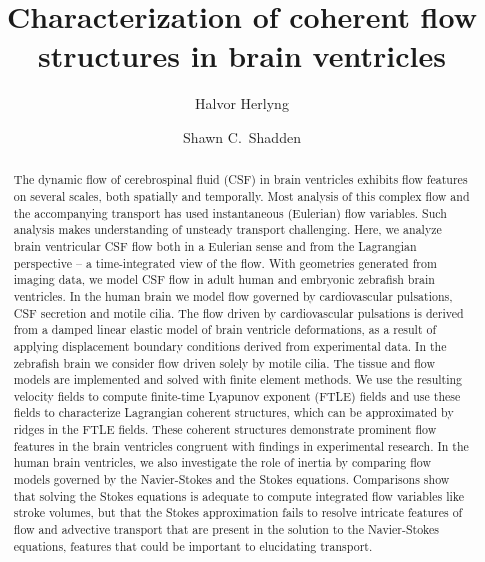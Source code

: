 \documentclass{template}
\title{\textbf{Characterization of coherent flow structures in brain ventricles}}
\author[1,2,*]{Halvor Herlyng}
\author[3]{Shawn C.~Shadden}
\affil[1]{Department of Numerical Analysis and Scientific Computing, Simula Research Laboratory, Oslo, Norway}
\affil[2]{Expert Analytics AS, Oslo, Norway}
\affil[3]{Department of Mechanical Engineering, University of California, Berkeley, USA}
\affil[*]{\href{mailto:halvor@xal.no}{halvor@xal.no}}
\date{\vspace{-2em}} %
\begin{document}
\maketitle

\begin{abstract}
    The dynamic flow of cerebrospinal fluid (CSF) in brain ventricles 
    exhibits flow features on several scales, both spatially and temporally.
    Most analysis of this complex flow and the accompanying transport
    has used instantaneous (Eulerian) flow variables. Such analysis
    makes understanding of unsteady transport challenging.
    Here, we analyze brain ventricular CSF flow both in a Eulerian
    sense and from the Lagrangian perspective -- a time-integrated view of the flow.
    With geometries generated from imaging data, we model CSF flow
    in adult human and embryonic zebrafish brain ventricles. 
    In the human brain we model flow governed by cardiovascular pulsations,
    CSF secretion and motile cilia. 
    The flow driven by cardiovascular pulsations is derived from a damped linear elastic model
    of brain ventricle deformations, as a result of applying displacement boundary
    conditions derived from experimental data.
    In the zebrafish brain we consider flow driven solely by motile cilia.
    The tissue and flow models are implemented and solved with finite element methods.
    We use the resulting velocity fields to compute finite-time Lyapunov exponent (FTLE)
    fields and use these fields to characterize Lagrangian coherent structures,
    which can be approximated by ridges in the FTLE fields.
    These coherent structures demonstrate prominent flow features in the brain ventricles
    congruent with findings in experimental research. In the human brain ventricles, we also 
    investigate the role of inertia by comparing flow models governed by 
    the Navier-Stokes and the Stokes equations. Comparisons show that
    solving the Stokes equations is adequate to compute integrated flow
    variables like stroke volumes, but that the Stokes approximation fails 
    to resolve intricate features of flow and advective transport that
    are present in the solution to the Navier-Stokes equations,
    features that could be important to elucidating transport.
\end{abstract}
\end{document}
